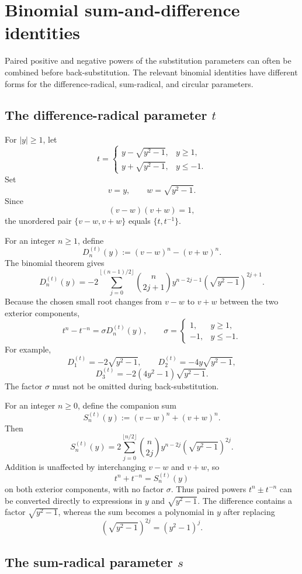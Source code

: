 \documentclass[11pt]{article}
\theoremstyle{remark}
\begin{document}
\section{Binomial sum-and-difference identities}
\label{app:binomial}

Paired positive and negative powers of the substitution parameters can often be combined before back-substitution. The relevant binomial identities have different forms for the difference-radical, sum-radical, and circular parameters.

\subsection*{The difference-radical parameter $t$}

For $|y|\ge1$, let
\[
t=
\begin{cases}
y-\sqrt{y^2-1},&y\ge1,\\[1mm]
y+\sqrt{y^2-1},&y\le-1.
\end{cases}
\]
Set
\[
v=y,
\qquad
w=\sqrt{y^2-1}.
\]
Since
\[
(v-w)(v+w)=1,
\]
the unordered pair $\{v-w,v+w\}$ equals $\{t,t^{-1}\}$.

For an integer $n\ge1$, define
\[
D_n^{(t)}(y):=(v-w)^n-(v+w)^n.
\]
The binomial theorem gives
\[
D_n^{(t)}(y)
=-2\sum_{j=0}^{\lfloor(n-1)/2\rfloor}
\binom{n}{2j+1}
y^{n-2j-1}\left(\sqrt{y^2-1}\right)^{2j+1}.
\]
Because the chosen small root changes from $v-w$ to $v+w$ between the two exterior components,
\[
t^n-t^{-n}=\sigma D_n^{(t)}(y),
\qquad
\sigma=
\begin{cases}
1,&y\ge1,\\
-1,&y\le-1.
\end{cases}
\]
For example,
\[
D_1^{(t)}=-2\sqrt{y^2-1},
\qquad
D_2^{(t)}=-4y\sqrt{y^2-1},
\]
\[
D_3^{(t)}=-2(4y^2-1)\sqrt{y^2-1}.
\]
The factor $\sigma$ must not be omitted during back-substitution.

For an integer $n\ge0$, define the companion sum
\[
S_n^{(t)}(y):=(v-w)^n+(v+w)^n.
\]
Then
\[
S_n^{(t)}(y)
=2\sum_{j=0}^{\lfloor n/2\rfloor}
\binom{n}{2j}
y^{n-2j}\left(\sqrt{y^2-1}\right)^{2j}.
\]
Addition is unaffected by interchanging $v-w$ and $v+w$, so
\[
t^n+t^{-n}=S_n^{(t)}(y)
\]
on both exterior components, with no factor $\sigma$. Thus paired powers $t^n\pm t^{-n}$ can be converted directly to expressions in $y$ and $\sqrt{y^2-1}$. The difference contains a factor $\sqrt{y^2-1}$, whereas the sum becomes a polynomial in $y$ after replacing
\[
\left(\sqrt{y^2-1}\right)^{2j}=(y^2-1)^j.
\]

\subsection*{The sum-radical parameter $s$}
\end{document}
